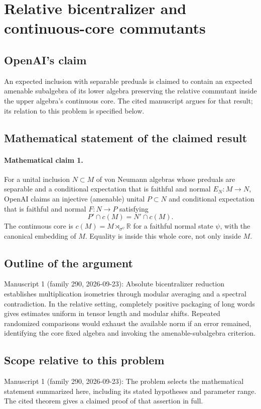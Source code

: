 \documentclass[11pt]{article}
\begin{document}
\section*{Relative bicentralizer and continuous-core commutants}

\subsection{OpenAI's claim}
An expected inclusion with separable preduals is claimed to contain an expected amenable subalgebra of its lower algebra preserving the relative commutant inside the upper algebra's continuous core. The cited manuscript argues for that result; its relation to this problem is specified below.

\subsection{Mathematical statement of the claimed result}
\paragraph{Mathematical claim 1.} For a unital inclusion $N\subset M$ of von Neumann algebras whose preduals are separable and a conditional expectation that is faithful and normal $E_N:M\to N$, OpenAI claims an injective (amenable) unital $P\subset N$ and conditional expectation that is faithful and normal $F:N\to P$ satisfying
\[
P'\cap c(M)=N'\cap c(M).
\]
The continuous core is $c(M)=M\rtimes_{\sigma^\psi}\mathbb R$ for a faithful normal state $\psi$, with the canonical embedding of $M$. Equality is inside this whole core, not only inside $M$.

\subsection{Outline of the argument}
Manuscript 1 (family 290, 2026-09-23): Absolute bicentralizer reduction establishes multiplication isometries through modular averaging and a spectral contradiction. In the relative setting, completely positive packaging of long words gives estimates uniform in tensor length and modular shifts. Repeated randomized comparisons would exhaust the available norm if an error remained, identifying the core fixed algebra and invoking the amenable-subalgebra criterion.

\subsection{Scope relative to this problem}
Manuscript 1 (family 290, 2026-09-23): The problem selects the mathematical statement summarized here, including its stated hypotheses and parameter range. The cited theorem gives a claimed proof of that assertion in full.
\end{document}
